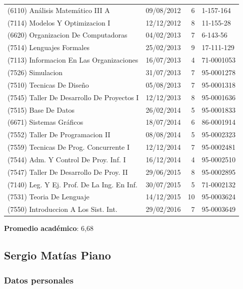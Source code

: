 \documentclass[a4paper,11pt]{article}
\begin{document}
\begin{longtable}{|l|l|r|l|}
  (6110) Análisis Matemático III A           & 09/08/2012 & 6  & 1-157-164         \\
  (7114) Modelos Y Optimizacion I            & 12/12/2012 & 8  & 11-155-28         \\
  (6620) Organizacion De Computadoras        & 04/02/2013 & 7  & 6-143-56          \\
  (7514) Lenguajes Formales                  & 25/02/2013 & 9  & 17-111-129        \\
  (7113) Informacion En Las Organizaciones   & 16/07/2013 & 4  & 71-0001053        \\
  (7526) Simulacion                          & 31/07/2013 & 7  & 95-0001278        \\
  (7510) Tecnicas De Diseño                  & 05/08/2013 & 7  & 95-0001318        \\
  (7545) Taller De Desarrollo De Proyectos I & 12/12/2013 & 8  & 95-0001636        \\
  (7515) Base De Datos                       & 26/02/2014 & 5  & 95-0001833        \\
  (6671) Sistemas Gráficos                   & 18/07/2014 & 6  & 86-0001914        \\
  (7552) Taller De Programacion II           & 08/08/2014 & 5  & 95-0002323        \\
  (7559) Tecnicas De Prog. Concurrente I     & 12/12/2014 & 7  & 95-0002481        \\
  (7544) Adm. Y Control De Proy. Inf. I      & 16/12/2014 & 4  & 95-0002510        \\
  (7547) Taller De Desarrollo De Proy. II    & 29/06/2015 & 8  & 95-0002895        \\
  (7140) Leg. Y Ej. Prof. De La Ing. En Inf. & 30/07/2015 & 5  & 71-0002132        \\
  (7531) Teoria De Lenguaje                  & 14/12/2015 & 10 & 95-0003624        \\
  (7550) Introduccion A Los Sist. Int.       & 29/02/2016 & 7  & 95-0003649        \\
  \hline
\end{longtable}

\textbf{Promedio académico}: 6,68

\subsection{Sergio Matías Piano}

\subsubsection{Datos personales}
\end{document}
